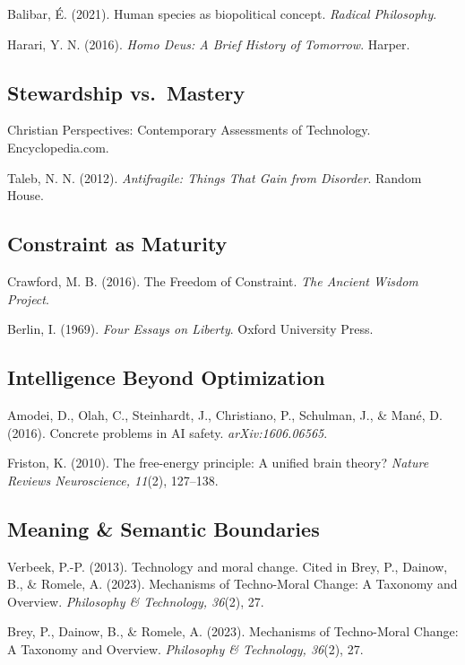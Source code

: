 \documentclass[
  openright]{book}
\begin{document}
Balibar, É. (2021). Human species as biopolitical concept. \emph{Radical
Philosophy}.

Harari, Y. N. (2016). \emph{Homo Deus: A Brief History of Tomorrow}.
Harper.

\subsection{Stewardship vs.~Mastery}\label{stewardship-vs.-mastery}

Christian Perspectives: Contemporary Assessments of Technology.
Encyclopedia.com.

Taleb, N. N. (2012). \emph{Antifragile: Things That Gain from Disorder}.
Random House.

\subsection{Constraint as Maturity}\label{constraint-as-maturity}

Crawford, M. B. (2016). The Freedom of Constraint. \emph{The Ancient
Wisdom Project}.

Berlin, I. (1969). \emph{Four Essays on Liberty}. Oxford University
Press.

\subsection{Intelligence Beyond
Optimization}\label{intelligence-beyond-optimization-1}

Amodei, D., Olah, C., Steinhardt, J., Christiano, P., Schulman, J., \&
Mané, D. (2016). Concrete problems in AI safety.
\emph{arXiv:1606.06565}.

Friston, K. (2010). The free-energy principle: A unified brain theory?
\emph{Nature Reviews Neuroscience, 11}(2), 127--138.

\subsection{Meaning \& Semantic
Boundaries}\label{meaning-semantic-boundaries}

Verbeek, P.-P. (2013). Technology and moral change. Cited in Brey, P.,
Dainow, B., \& Romele, A. (2023). Mechanisms of Techno-Moral Change: A
Taxonomy and Overview. \emph{Philosophy \& Technology, 36}(2), 27.

Brey, P., Dainow, B., \& Romele, A. (2023). Mechanisms of Techno-Moral
Change: A Taxonomy and Overview. \emph{Philosophy \& Technology, 36}(2),
27.
\end{document}
